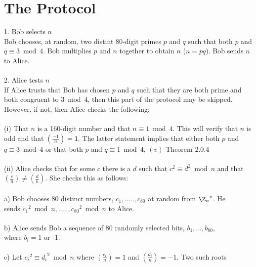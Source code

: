 



\chapter{The Protocol}

1. Bob selects $n$\\
Bob chooses, at random, two distint 80-digit primes $p$ and $q$ such that both $p$ and $q \equiv 3 \bmod 4$. Bob multiplies $p$ and $n$ together to obtain $n$ ($n = pq$). Bob sends $n$ to Alice. \\ 
\\
2. Alice tests $n$\\
If Alice trusts that Bob has chosen $p$ and $q$ such that they are both prime and both congruent to $3 \bmod 4$, then this part of the protocol may be skipped. However, if not, then Alice checks the following:\\
\\
(i) That $n$ is a 160-digit number and that $n \equiv 1\bmod 4$. This will verify that $n$ is odd and that $\left(\frac{-1}{n}\right) = 1$. The latter statement implies that either both $p$ and $q \equiv 3 \bmod 4$ or that both $p$ and $q \equiv 1 \bmod 4$, $(v)$ Theorem 2.0.4\\
\\
(ii) Alice checks that for some $c$ there is a $d$ such that $c^2 \equiv d^2 \bmod n$ and that $\left(\frac{c}{n}\right) \neq \left(\frac{d}{n}\right)$. She checks this as follows:\\
\\
\indent a) Bob chooses 80 distinct numbers, $c_1,.....,c_{80}$ at random from ${\Z_{n}}^*$. He\\ 
\indent sends ${c_1}^2 \bmod n,.....,{c_{80}}^2 \bmod n$ to Alice.\\
\\
\indent b) Alice sends Bob a sequence of 80 randomly selected bits, $b_1,...,b_{80}$,\\
\indent where $b_i = 1$ or -1.\\
\\
\indent c) Let ${c_i}^2 \equiv {d_i}^2 \bmod n$ where $\left(\frac{c_i}{n}\right)= 1$  and $\left(\frac{d_i}{n}\right) = -1$. Two such roots\\
